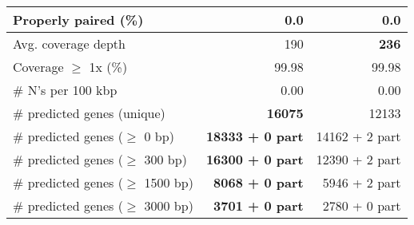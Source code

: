 \documentclass[12pt,a4paper]{article}
\begin{document}
\begin{table}[ht]
\begin{center}
\begin{tabular}{|l*{2}{|r}|}
Properly paired (\%) & 0.0 & 0.0 \\ \hline
Avg. coverage depth & 190 & {\bf 236} \\ \hline
Coverage $\geq$ 1x (\%) & 99.98 & 99.98 \\ \hline
\# N's per 100 kbp & 0.00 & 0.00 \\ \hline
\# predicted genes (unique) & {\bf 16075} & 12133 \\ \hline
\# predicted genes ($\geq$ 0 bp) & {\bf 18333 + 0 part} & 14162 + 2 part \\ \hline
\# predicted genes ($\geq$ 300 bp) & {\bf 16300 + 0 part} & 12390 + 2 part \\ \hline
\# predicted genes ($\geq$ 1500 bp) & {\bf 8068 + 0 part} & 5946 + 2 part \\ \hline
\# predicted genes ($\geq$ 3000 bp) & {\bf 3701 + 0 part} & 2780 + 0 part \\ \hline
\end{tabular}
\end{center}
\end{table}
\end{document}
